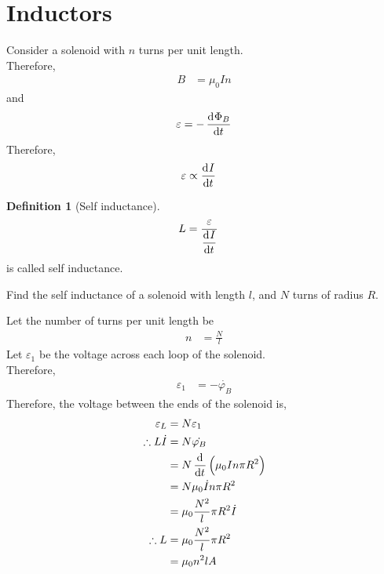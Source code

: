 \documentclass[fleqn, a4paper, 12pt, twoside]{article}
\theoremstyle{definition}
\newtheorem{definition}{Definition}
\theoremstyle{theorem}
\begin{document}
\section{Inductors}

Consider a solenoid with $n$ turns per unit length.\\
Therefore,
\begin{align*}
	B &= \mu_0 I n
\end{align*}
and
\begin{align*}
	\varepsilon &= -\dod{\Phi_B}{t}\\
\end{align*}
Therefore,
\begin{align*}
	\varepsilon &\propto \dod{I}{t}
\end{align*}

\begin{definition}[Self inductance]
	\begin{align*}
		L &= \frac{\varepsilon}{\dod{I}{t}}
	\end{align*}
	is called self inductance.
\end{definition}

\begin{question}
	Find the self inductance of a solenoid with length $l$, and $N$ turns of radius $R$.
\end{question}

\begin{solution}
	Let the number of turns per unit length be
	\begin{align*}
		n &= \frac{N}{l}
	\end{align*}
	Let $\varepsilon_1$ be the voltage across each loop of the solenoid.\\
	Therefore,
	\begin{align*}
		\varepsilon_1 &= -\dot{\varphi_B}
	\end{align*}
	Therefore, the voltage between the ends of the solenoid is,
	\begin{align*}
		\varepsilon_L &= N \varepsilon_1\\
		\therefore L \dot{I} &= N \dot{\varphi_B}\\
		&= N \dod{}{t}\left( \mu_0 I n \pi R^2 \right)\\
		&= N \mu_0 \dot{I} n \pi R^2\\
		&= \mu_0 \frac{N^2}{l} \pi R^2 \dot{I}\\
		\therefore L &= \mu_0 \frac{N^2}{l} \pi R^2\\
		&= \mu_0 n^2 l A
	\end{align*}
\end{solution}
\end{document}
